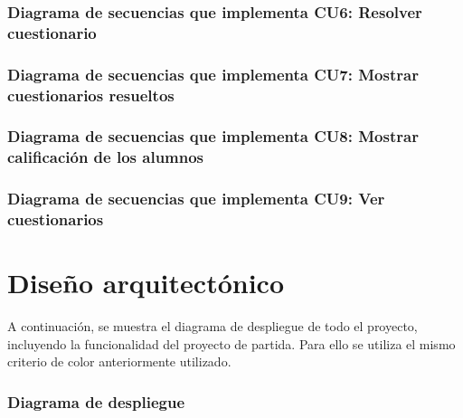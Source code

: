 
\subsubsection{Diagrama de secuencias que implementa CU6: Resolver cuestionario}


\subsubsection{Diagrama de secuencias que implementa CU7: Mostrar cuestionarios resueltos}


\subsubsection{Diagrama de secuencias que implementa CU8: Mostrar calificación de los alumnos}

\subsubsection{Diagrama de secuencias que implementa CU9: Ver cuestionarios}

\section{Diseño arquitectónico}

A continuación, se muestra el diagrama de despliegue de todo el proyecto, incluyendo la funcionalidad del proyecto de partida. Para ello se utiliza el mismo criterio de color anteriormente utilizado.

\subsubsection{Diagrama de despliegue}




